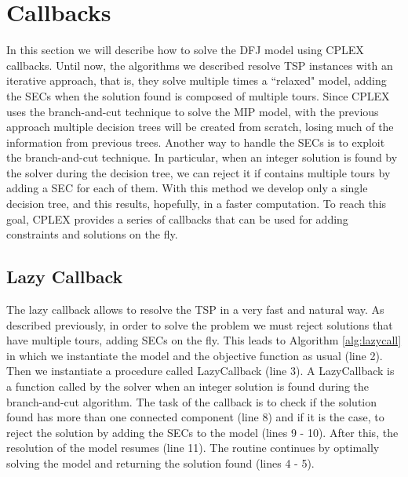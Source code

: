 \clearpage
\section{Callbacks}
In this section we will describe how to solve the DFJ model using CPLEX callbacks. Until now, the algorithms we described resolve TSP instances with an iterative approach, that is, they solve multiple times a ``relaxed" model, adding the SECs when the solution found is composed of multiple tours. Since CPLEX uses the branch-and-cut technique to solve the MIP model, with the previous approach multiple decision trees will be created from scratch, losing much of the information from previous trees. Another way to handle the SECs is to exploit the branch-and-cut technique. In particular, when an integer solution is found by the solver during the decision tree, we can reject it if contains multiple tours by adding a SEC for each of them. With this method we develop only a single decision tree, and this results, hopefully, in a faster computation. To reach this goal, CPLEX provides a series of callbacks that can be used for adding constraints and solutions on the fly.

\subsection{Lazy Callback}
The lazy callback allows to resolve the TSP in a very fast and natural way. As described previously, in order to solve the problem we must reject solutions that have multiple tours, adding SECs on the fly. This leads to Algorithm \ref{alg:lazycall} in which we instantiate the model and the objective function as usual (line 2). Then we instantiate a procedure called LazyCallback (line 3). A LazyCallback is a function called by the solver when an integer solution is found during the branch-and-cut algorithm. The task of the callback is to check if the solution found has more than one connected component (line 8) and if it is the case, to reject the solution by adding the SECs to the model (lines 9 - 10). After this, the resolution of the model resumes (line 11).
The routine continues by optimally solving the model and returning the solution found (lines 4 - 5).


